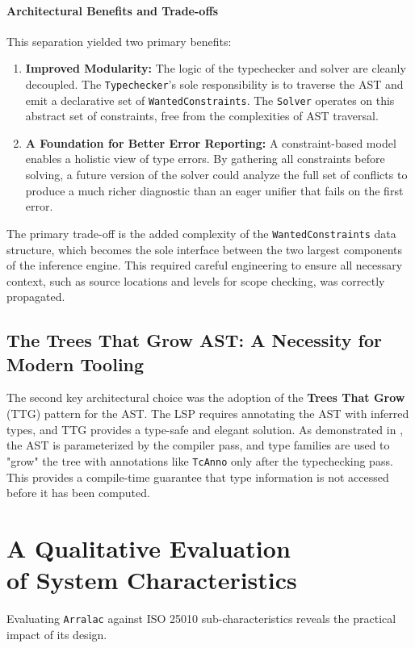 \paragraph{Architectural Benefits and Trade-offs}
This separation yielded two primary benefits:
\begin{enumerate}
    \item \textbf{Improved Modularity:} The logic of the typechecker and solver are cleanly decoupled. The \texttt{Typechecker}'s sole responsibility is to traverse the AST and emit a declarative set of \texttt{WantedConstraints}. The \texttt{Solver} operates on this abstract set of constraints, free from the complexities of AST traversal.
    \item \textbf{A Foundation for Better Error Reporting:} A constraint-based model enables a holistic view of type errors. By gathering all constraints before solving, a future version of the solver could analyze the full set of conflicts to produce a much richer diagnostic than an eager unifier that fails on the first error.
\end{enumerate}

The primary trade-off is the added complexity of the \texttt{WantedConstraints} data structure, which becomes the sole interface between the two largest components of the inference engine. This required careful engineering to ensure all necessary context, such as source locations and levels for scope checking, was correctly propagated.

\subsection{The Trees That Grow AST: A Necessity for Modern Tooling}
The second key architectural choice was the adoption of the \textbf{Trees That Grow} (TTG) pattern for the AST. The LSP requires annotating the AST with inferred types, and TTG provides a type-safe and elegant solution. As demonstrated in , the AST is parameterized by the compiler pass, and type families are used to "grow" the tree with annotations like \texttt{TcAnno} only after the typechecking pass. This provides a compile-time guarantee that type information is not accessed before it has been computed.

\section[A Qualitative Evaluation of System Characteristics]{A Qualitative Evaluation \\ of System Characteristics}
\label{sec:Discussion:Characteristics}
Evaluating \texttt{Arralac} against ISO 25010 \cite{iso-25010} sub-characteristics reveals the practical impact of its design.

